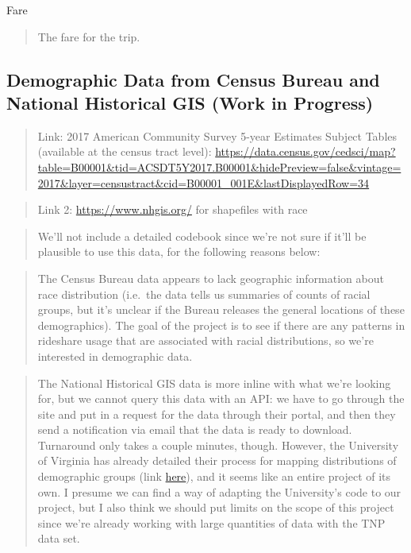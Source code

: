 \documentclass[]{article}
\begin{document}
Fare

\begin{quote}
The fare for the trip.
\end{quote}

\hypertarget{demographic-data-from-census-bureau-and-national-historical-gis-work-in-progress}{%
\subsection{Demographic Data from Census Bureau and National Historical
GIS (Work in
Progress)}\label{demographic-data-from-census-bureau-and-national-historical-gis-work-in-progress}}

\begin{quote}
Link: 2017 American Community Survey 5-year Estimates Subject Tables
(available at the census tract level):
\url{https://data.census.gov/cedsci/map?table=B00001\&tid=ACSDT5Y2017.B00001\&hidePreview=false\&vintage=2017\&layer=censustract\&cid=B00001_001E\&lastDisplayedRow=34}
\end{quote}

\begin{quote}
Link 2: \url{https://www.nhgis.org/} for shapefiles with race
\end{quote}

\begin{quote}
We'll not include a detailed codebook since we're not sure if it'll be
plausible to use this data, for the following reasons below:
\end{quote}

\begin{quote}
The Census Bureau data appears to lack geographic information about race
distribution (i.e.~the data tells us summaries of counts of racial
groups, but it's unclear if the Bureau releases the general locations of
these demographics). The goal of the project is to see if there are any
patterns in rideshare usage that are associated with racial
distributions, so we're interested in demographic data.
\end{quote}

\begin{quote}
The National Historical GIS data is more inline with what we're looking
for, but we cannot query this data with an API: we have to go through
the site and put in a request for the data through their portal, and
then they send a notification via email that the data is ready to
download. Turnaround only takes a couple minutes, though. However, the
University of Virginia has already detailed their process for mapping
distributions of demographic groups (link
\href{https://demographics.coopercenter.org/racial-dot-map\#thedata}{here}),
and it seems like an entire project of its own. I presume we can find a
way of adapting the University's code to our project, but I also think
we should put limits on the scope of this project since we're already
working with large quantities of data with the TNP data set.
\end{quote}
\end{document}
